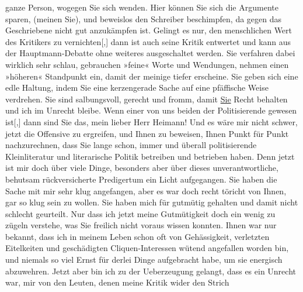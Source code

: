 \begin{ledgroupsized}[t]{13cm}
               ganze Person, wogegen Sie sich wenden. Hier können Sie sich die Argumente sparen,
               (meinen Sie), und beweislos den Schreiber beschimpfen, da gegen das Geschriebene
               nicht gut anzukämpfen ist. Gelingt es nur, den menschlichen Wert des Kritikers zu
                  vernichten{[},{]} dann ist auch seine Kritik entwertet und kann aus der Hauptmann-Debatte ohne weiteres ausgeschaltet
               werden.\pend
           \pstart
           Sie verfahren dabei wirklich sehr schlau, gebrauchen »feine« Worte und Wendungen,
               nehmen einen »höheren« Standpunkt ein, damit der meinige tiefer erscheine. Sie geben
               sich eine edle Haltung, indem Sie eine kerzengerade Sache auf eine pfäffische Weise
               verdrehen. Sie sind salbungsvoll, gerecht und fromm, damit \uline{Sie} Recht behalten und ich im Unrecht bleibe.\pend
           \pstart
           Wenn einer von uns beiden der Politisierende gewesen ist{[},{]} dann
               sind Sie das, mein lieber Herr Heimann! Und es
               wäre mir nicht schwer, jetzt die Offensive zu ergreifen, und Ihnen zu beweisen, Ihnen
               Punkt für Punkt nachzurechnen, dass Sie lange schon, immer und überall politisierende Kleinliteratur und
               literarische Politik betreiben und betrieben haben. Denn jetzt ist mir doch über
               viele Dinge, besonders aber über dieses unverantwortliche, behutsam rückversicherte
               Predigertum ein Licht aufgegangen.\pend
           \pstart
           Sie haben die Sache mit mir sehr klug angefangen, aber es war doch recht töricht von
               Ihnen, gar so klug sein zu wollen. Sie haben mich für gutmütig gehalten und damit
               nicht schlecht ge{\pb}urteilt. Nur
               dass ich jetzt meine Gutmütigkeit doch ein wenig zu zügeln verstehe, was Sie freilich
               nicht voraus wissen konnten. Ihnen war nur bekannt, dass ich in meinem Leben schon
               oft von Gehässigkeit, verletzten Eitelkeiten und geschädigten Cliquen-Interessen
               wütend angefallen worden bin, und niemals so viel Ernst für derlei Dinge aufgebracht
               habe, um sie energisch abzuwehren. Jetzt aber bin ich zu der Ueberzeugung gelangt,
               dass es ein Unrecht war, mir von den Leuten, denen meine Kritik wider den Strich

\end{ledgroupsized}
